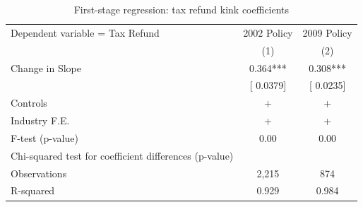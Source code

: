 \begin{table}[htbp]
\centering
\caption{First-stage regression: tax refund kink coefficients}
\begin{tabular}{lcc}
\hline\hline
Dependent variable = Tax Refund & 2002 Policy & 2009 Policy \\
 & (1) & (2) \\
\hline
Change in Slope &  0.364*** &  0.308*** \\
 & [ 0.0379] & [ 0.0235] \\
Controls & + & + \\
Industry F.E. & + & + \\
F-test (p-value) & 0.00 & 0.00 \\
Chi-squared test for coefficient differences (p-value) &  &  \\
Observations &        2,215 &          874 \\
R-squared & 0.929 & 0.984 \\
\hline\hline
\end{tabular}
\end{table}
